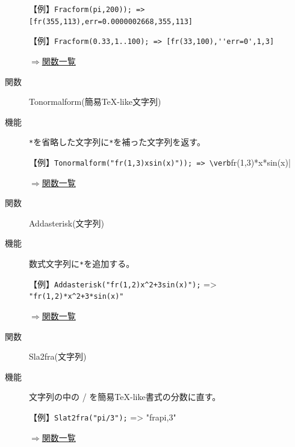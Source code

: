 \documentclass[papersize,a4paper,10pt,uplatex]{jsarticle}
\begin{document}
\begin{description}
【例】\verb|Fracform(pi,200)); => [fr(355,113),err=0.0000002668,355,113]|

【例】\verb|Fracform(0.33,1..100); => [fr(33,100),''err=0',1,3]|

\begin{flushright}\hyperlink{functionlist}{$\Rightarrow$関数一覧}\end{flushright}

\vspace{\baselineskip}
\hypertarget{tonormalform}{}
\item[関数]Tonormalform(簡易TeX-like文字列)
\item[機能]\verb|*|を省略した文字列に\verb|*|を補った文字列を返す。

\vspace{\baselineskip}
【例】\verb|Tonormalform("fr(1,3)xsin(x)")); => \verb|fr(1,3)*x*sin(x)|

\begin{flushright}\hyperlink{functionlist}{$\Rightarrow$関数一覧}\end{flushright}

\vspace{\baselineskip}

\hypertarget{addasterisk}{}
\item[関数]Addasterisk(文字列)
\item[機能]数式文字列に\verb|*|を追加する。

\vspace{\baselineskip}

【例】\verb|Addasterisk("fr(1,2)x^2+3sin(x)");| => \verb|"fr(1,2)*x^2+3*sin(x)" |

\begin{flushright}\hyperlink{functionlist}{$\Rightarrow$関数一覧}\end{flushright}

\vspace{\baselineskip}

\hypertarget{sla2fra}{}
\item[関数]Sla2fra(文字列)
\item[機能]文字列の中の / を簡易TeX-like書式の分数に直す。

\vspace{\baselineskip}

【例】\verb|Slat2fra("pi/3");| => "fra{pi,3}" 

\begin{flushright}\hyperlink{functionlist}{$\Rightarrow$関数一覧}\end{flushright}


\end{description}
\end{document}
